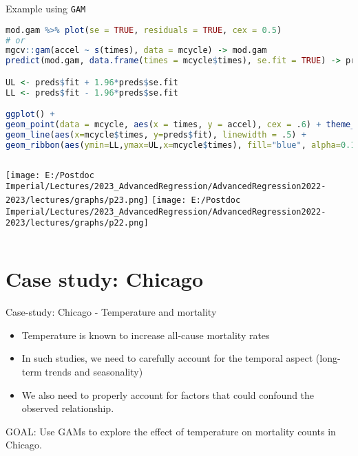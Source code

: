 \documentclass{beamer}
\begin{document}
\begin{frame}[fragile]{Example using \texttt{GAM}}
	\begin{lstlisting}[language=R, basicstyle=\tiny]
mod.gam %>% plot(se = TRUE, residuals = TRUE, cex = 0.5)
# or
mgcv::gam(accel ~ s(times), data = mcycle) -> mod.gam
predict(mod.gam, data.frame(times = mcycle$times), se.fit = TRUE) -> preds

UL <- preds$fit + 1.96*preds$se.fit
LL <- preds$fit - 1.96*preds$se.fit

ggplot() + 
geom_point(data = mcycle, aes(x = times, y = accel), cex = .6) + theme_bw() + 
geom_line(aes(x=mcycle$times, y=preds$fit), linewidth = .5) + 
geom_ribbon(aes(ymin=LL,ymax=UL,x=mcycle$times), fill="blue", alpha=0.1)
	\end{lstlisting}
	\begin{columns}
		\texttt{[image: E:/Postdoc Imperial/Lectures/2023\_AdvancedRegression/AdvancedRegression2022-2023/lectures/graphs/p23.png]}
		\texttt{[image: E:/Postdoc Imperial/Lectures/2023\_AdvancedRegression/AdvancedRegression2022-2023/lectures/graphs/p22.png]}
\end{columns}
\end{frame}


\section{Case study: Chicago}
\begin{frame}{Case-study: Chicago - Temperature and mortality}
\begin{itemize}
	\item Temperature is known to increase all-cause mortality rates
	\item In such studies, we need to carefully account for the temporal aspect (long-term trends and seasonality)
	\item We also need to properly account for factors that could confound the observed relationship. 
\end{itemize}

GOAL: Use GAMs to explore the effect of temperature on mortality counts in Chicago. 
\end{frame}	
\end{document}
